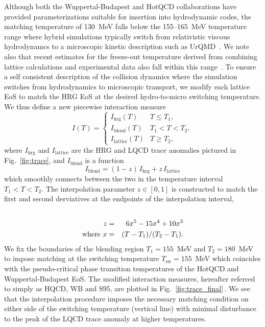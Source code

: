 \documentclass[aps,prc,reprint,amsmath,nofootinbib,superscriptaddress]{revtex4-1}
\begin{document}
Although both the Wuppertal-Budapest and HotQCD collaborations have provided parameterizations suitable for insertion into hydrodynamic codes, the matching temperature of 130~MeV falls below the 155--165~MeV temperature range where hybrid simulations typically switch from relativistic viscous hydrodynamcs to a microscopic kinetic description such as UrQMD~\cite{Bass:1998ca,Bleicher:1999xi}.  
We note also that recent estimates for the freeze-out temperature derived from combining lattice calculations and experimental data also fall within this range~\cite{Bazavov:2014xya, Adare:2015aqk}.  
To ensure a self consistent description of the collision dynamics where the simulation switches from hydrodynamics to microscopic transport, we modify each lattice EoS to match the HRG EoS at the desired hydro-to-micro switching temperature. We thus define a new piecewise interaction measure
\begin{equation}
 \label{interaction}
 I(T) =
  \begin{cases}
   I_\text{hrg}(T)	& T \le T_1, \\
   I_\text{blend}(T)	& T_1 < T < T_2, \\ 
   I_\text{lattice}(T)	& T \ge T_2,
  \end{cases}
\end{equation}
where $I_\text{hrg}$ and $I_\text{lattice}$ are the HRG and LQCD trace anomalies pictured in Fig.~\ref{fig:trace}, and $I_\text{blend}$ is a function 
\begin{equation}
  \label{interpolation}
  I_\text{blend} = (1-z)\, I_\text{hrg} + z\, I_\text{lattice}
\end{equation}
which smoothly connects between the two in the temperature interval $T_1 < T < T_2$. The interpolation parameter $z \in [0,1]$ is constructed to match the first and second derviatives at the endpoints of the interpolation interval,
\begin{eqnarray}
 \label{smoothstep}
 \cr z &=& 6 x^5 - 15 x^4 + 10 x^3 \\
  \text{where } x &=& (T - T_1)/(T_2 - T_1).
\end{eqnarray}
We fix the boundaries of the blending region $T_1=155$~MeV and $T_2=180$~MeV to impose matching at the switching temperature $T_\text{sw} = 155$~MeV which coincides with the pseudo-critical phase transition temperatures of the HotQCD and Wuppertal-Budapest EoS. The modified interaction measures, hereafter referred to simply as HQCD, WB and S95, are plotted in Fig.~\ref{fig:trace_final}\,. We see that the interpolation procedure imposes the necessary matching condition on either side of the switching temperature (vertical line) with minimal disturbance to the peak of the LQCD trace anomaly at higher temperatures.
\end{document}

